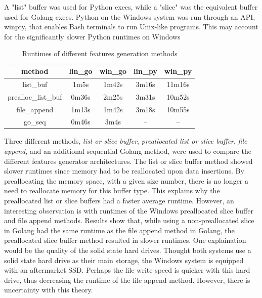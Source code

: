 \begin{table}[h!]
    \centering
    \caption{Runtimes of different features generation methods}
    {\small A "list" buffer was used for Python execs, while a "slice" was the equivalent buffer used for Golang execs. Python on the Windows system was run through an API, winpty, that enables Bash terminals to run Unix-like programs. This may account for the significantly slower Python runtimes on Windows}
    \bigskip
	\label{tab:runtimes-of-different-features-generation-methods}
    \begin{tabular}{ |c|c|c|c|c| }
        \hline
        \textbf{method} & \textbf{lin{\_}go} & \textbf{win{\_}go} & \textbf{lin{\_}py} & \textbf{win{\_}py} \\
        \hline
        list{\_}buf & 1m5s & 1m42s & 3m16s & 11m16s \\
        prealloc{\_}list{\_}buf & 0m36s & 2m25s & 3m31s & 10m52s \\
        file{\_}append & 1m13s & 1m42s & 3m18s & 10m55s \\
        go{\_}seq & 0m46s & 3m4s & -- & -- \\
        \hline
    \end{tabular}
\end{table}

Three different methods, \textit{list or slice buffer}, \textit{preallocated list or slice buffer}, \textit{file append}, and an additional sequential Golang method, were used to compare the different features generator architectures. The list or slice buffer method showed slower runtimes since memory had to be reallocated upon data insertions. By preallocating the memory space, with a given size number, there is no longer a need to reallocate memory for this buffer type. This explains why the preallocated list or slice buffers had a faster average runtime. However, an interesting observation is with runtimes of the Windows preallocated slice buffer and file append methods. Results show that, while using a non-preallocated slice in Golang had the same runtime as the file append method in Golang, the preallocated slice buffer method resulted in slower runtimes. One explaination would be the quality of the solid state hard drives. Thought both systems use a solid state hard drive as their main storage, the Windows system is equipped with an aftermarket SSD. Perhaps the file write speed is quicker with this hard drive, thus decreasing the runtime of the file append method. However, there is uncertainty with this theory.

